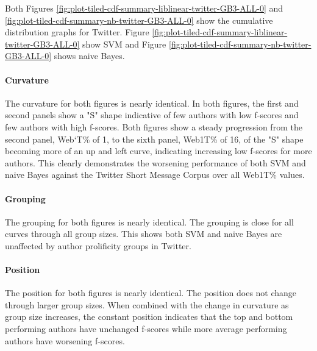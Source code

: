  Both Figures \ref{fig:plot-tiled-cdf-summary-liblinear-twitter-GB3-ALL-0} and \ref{fig:plot-tiled-cdf-summary-nb-twitter-GB3-ALL-0} show the cumulative distribution graphs for Twitter.  Figure \ref{fig:plot-tiled-cdf-summary-liblinear-twitter-GB3-ALL-0} show SVM and Figure \ref{fig:plot-tiled-cdf-summary-nb-twitter-GB3-ALL-0} shows naive Bayes.  
 \paragraph*{Curvature} The curvature for both figures is nearly identical.  In both figures, the first and second panels show a "S" shape indicative of few authors with low f-scores and few authors with high f-scores.  Both figures show a steady progression from the second panel, Web`T\% of 1, to the sixth panel, Web1T\% of 16, of the "S" shape becoming more of an up and left curve, indicating increasing low f-scores for more authors.  This clearly demonstrates the worsening performance of both SVM and naive Bayes against the Twitter Short Message Corpus over all Web1T\% values.
 \paragraph*{Grouping} The grouping for both figures is nearly identical.  The grouping is close for all curves through all group sizes. This shows both SVM and naive Bayes are unaffected by author prolificity groups in Twitter.
 \paragraph*{Position} The position for both figures is nearly identical. The position does not change through larger group sizes.  When combined with the change in curvature as group size increases, the constant position indicates that the top and bottom performing authors have unchanged f-scores while more average performing authors have worsening f-scores.
